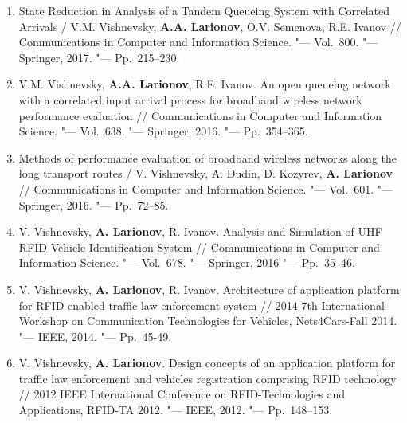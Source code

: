 \begin{frame}
\begin{enumerate}
        \item State Reduction in Analysis of a Tandem Queueing System with Correlated Arrivals / V.M. Vishnevsky, \textbf{A.A. Larionov}, O.V. Semenova, R.E. Ivanov // Communications in Computer and Information Science. "--- Vol.~800. "--- Springer, 2017. "--- Pp.~215--230.
        \item V.M. Vishnevsky, \textbf{A.A. Larionov}, R.E. Ivanov. An open queueing network with a correlated input arrival process for broadband wireless network performance evaluation // Communications in Computer and Information Science. "--- Vol.~638. "--- Springer, 2016. "--- Pp.~354--365.
        \item Methods of performance evaluation of broadband wireless networks along the long transport routes / V. Vishnevsky, A. Dudin, D. Kozyrev, \textbf{A. Larionov} // Communications in Computer and Information Science. "--- Vol.~601. "--- Springer, 2016. "--- Pp.~72--85.
        \item V. Vishnevsky, \textbf{A. Larionov}, R. Ivanov. Analysis and Simulation of UHF RFID Vehicle Identification System // Communications in Computer and Information Science. "--- Vol.~678. "--- Springer, 2016 "--- Pp.~35--46.
        \item V. Vishnevsky, \textbf{A. Larionov}, R. Ivanov. Architecture of application platform for RFID-enabled traffic law enforcement system // 2014 7th International Workshop on Communication Technologies for Vehicles, Nets4Cars-Fall 2014. "--- IEEE, 2014. "--- Pp.~45-49.
        \item V. Vishnevsky, \textbf{A. Larionov}. Design concepts of an application platform for traffic law enforcement and vehicles registration comprising RFID technology // 2012 IEEE International Conference on RFID-Technologies and Applications, RFID-TA 2012. "--- IEEE, 2012. "--- Pp.~148--153.
    \end{enumerate}
\end{frame}




